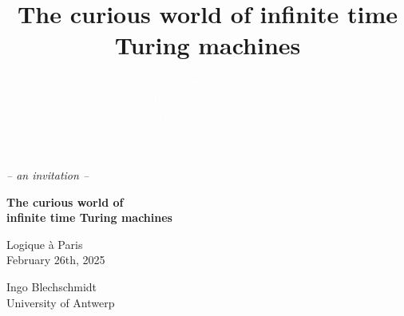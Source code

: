 \documentclass[12pt,compress,english,utf8,t,aspectratio=169]{beamer}
\title[{Exploring hypercomputation with the ef{}fective topos}]{The curious world of infinite time Turing machines}
\author[Ingo Blechschmidt]{\textcolor{white}{Ingo Blechschmidt \\ \scriptsize
University of Antwerp \\ February 26th, 2025}}
\date[2025-02-26]{}
\renewcommand{\_}{\mathpunct{.}\,}
\begin{document}
{
\addtocounter{framenumber}{-2}
\begin{frame}[plain,c]
  \centering

  \bigskip
  \bigskip
  \bigskip
  \bigskip

  \color{white}

  \color{black}
  \scriptsize
  \color{white}
  \textit{-- an invitation --}

  \vspace*{-0.5em}

  \begin{minipage}{0.55\textwidth}\begin{block}{}
    \centering\normalsize\color{white}
    \bf
    The curious world of \\
    \phantom{g}infinite time Turing machines\phantom{g}
  \end{block}\end{minipage}

  \bigskip
  \bigskip
  \bigskip
  \bigskip
  \bigskip
  \bigskip

  Logique à Paris \\
  February 26th, 2025
  \bigskip

  Ingo Blechschmidt \\
  University of Antwerp
  \par
\end{frame}}
\setcounter{tocdepth}{2}
\end{document}
